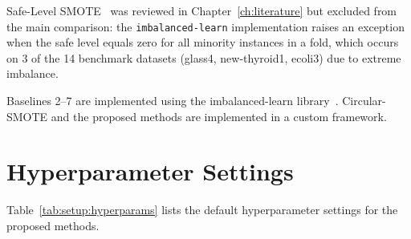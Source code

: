 Safe-Level SMOTE~\cite{bunkhumpornpat2009safe} was reviewed in Chapter~\ref{ch:literature} but excluded from the main comparison: the \texttt{imbalanced-learn} implementation raises an exception when the safe level equals zero for all minority instances in a fold, which occurs on 3 of the 14 benchmark datasets (glass4, new-thyroid1, ecoli3) due to extreme imbalance.

Baselines 2--7 are implemented using the imbalanced-learn library~\cite{lemaitre2017imbalanced}.
Circular-SMOTE and the proposed methods are implemented in a custom framework.


\section{Hyperparameter Settings}
\label{sec:setup:hyperparams}

Table~\ref{tab:setup:hyperparams} lists the default hyperparameter settings for the proposed methods.

